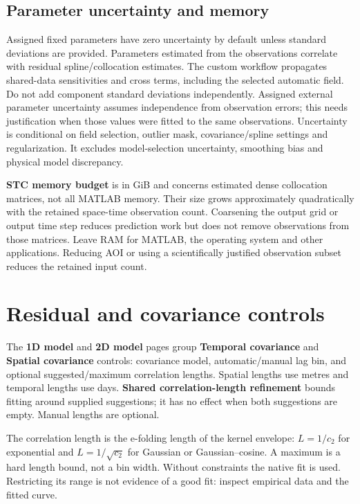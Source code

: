 \subsection{Parameter uncertainty and memory}
Assigned fixed parameters have zero uncertainty by default unless standard deviations are provided. Parameters estimated from the observations correlate with residual spline/collocation estimates. The custom workflow propagates shared-data sensitivities and cross terms, including the selected automatic field. Do not add component standard deviations independently. Assigned external parameter uncertainty assumes independence from observation errors; this needs justification when those values were fitted to the same observations. Uncertainty is conditional on field selection, outlier mask, covariance/spline settings and regularization. It excludes model-selection uncertainty, smoothing bias and physical model discrepancy.

\textbf{STC memory budget} is in GiB and concerns estimated dense collocation matrices, not all MATLAB memory. Their size grows approximately quadratically with the retained space-time observation count. Coarsening the output grid or output time step reduces prediction work but does not remove observations from those matrices. Leave RAM for MATLAB, the operating system and other applications. Reducing AOI or using a scientifically justified observation subset reduces the retained input count.

\section{Residual and covariance controls}\label{sec:covariance-controls}
The \textbf{1D model} and \textbf{2D model} pages group \textbf{Temporal covariance} and \textbf{Spatial covariance} controls: covariance model, automatic/manual lag bin, and optional suggested/maximum correlation lengths. Spatial lengths use metres and temporal lengths use days. \textbf{Shared correlation-length refinement} bounds fitting around supplied suggestions; it has no effect when both suggestions are empty. Manual lengths are optional.

The correlation length is the e-folding length of the kernel envelope: $L=1/c_2$ for exponential and $L=1/\sqrt{c_2}$ for Gaussian or Gaussian--cosine. A maximum is a hard length bound, not a bin width. Without constraints the native fit is used. Restricting its range is not evidence of a good fit: inspect empirical data and the fitted curve.

